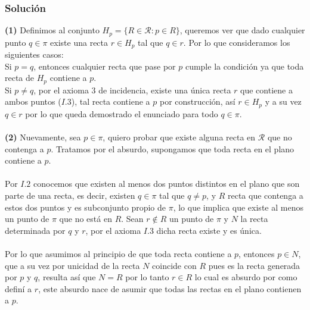 \documentclass[a4paper]{article}
\begin{document}
\subsubsection{Solución}
\textbf{(1)} Definimos al conjunto $H_p=\{R \in \mathcal{R}: p \in R\}$, queremos ver que dado cualquier punto $q \in \pi$ existe una recta $r \in H_p$ tal que $q \in r$. Por lo que consideramos los siguientes casos:\\
Si $p=q$, entonces cualquier recta que pase por $p$ cumple la condición ya que toda recta de $H_p$ contiene a $p$.\\
Si $p \neq q$, por el axioma 3 de incidencia, existe una única recta $r$ que contiene a ambos puntos ($I.3$), tal recta contiene a $p$ por construcción, así $r \in H_p$ y a su vez $q \in r$ por lo que queda demostrado el enunciado para todo $q \in \pi$.\\\\
\textbf{(2)} Nuevamente, sea $p \in \pi$, quiero probar que existe alguna recta en $\mathcal{R}$ que no contenga a $p$. Tratamos por el absurdo, supongamos que toda recta en el plano contiene a $p$.\\\\
Por $I.2$ conocemos que existen al menos dos puntos distintos en el plano que son parte de una recta, es decir, existen $q \in \pi$ tal que $q \neq p$, y $R$ recta que contenga a estos dos puntos y es subconjunto propio de $\pi$, lo que implica que existe al menos un punto de $\pi$ que no está en $R$. Sean $r \notin R$ un punto de $\pi$ y $N$ la recta determinada por $q$ y $r$, por el axioma $I.3$ dicha recta existe y es única.\\\\
Por lo que asumimos al principio de que toda recta contiene a $p$, entonces $p \in N$, que a su vez por unicidad de la recta $N$ coincide con $R$ pues es la recta generada por $p$ y $q$, resulta así que $N = R$ por lo tanto $r \in R$ lo cual es absurdo por como definí a $r$, este absurdo nace de asumir que todas las rectas en el plano contienen a $p$.\\\\
\end{document}
